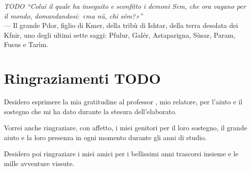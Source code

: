 \cleardoublepage
{}
{}

\begin{flushright}{
    \slshape TODO
    ``Colui il quale ha inseguito e sconfitto i demoni Sem, che ora vagano per il mondo, domandandosi: «ma nü, chi sëm?»''} \\
    \medskip
    --- Il grande Pdor, figlio di Kmer, della tribù di Ishtar, della terra desolata dei Kfnir, uno degli ultimi sette saggi: Pfulur, Galér, Astaparigna, Sùsar, Param, Fusus e Tarìm.
\end{flushright}

\begingroup
\let\clearpage\relax
\let\cleardoublepage\relax
\let\cleardoublepage\relax

\chapter*{Ringraziamenti TODO}

\noindent Desidero esprimere la mia gratitudine al professor \myProf, mio relatore, per l'aiuto e il sostegno che mi ha dato durante la stesura dell'elaborato.

\vspace{0.35cm}

\noindent Vorrei anche ringraziare, con affetto, i miei genitori per il loro sostegno, il grande aiuto e la loro presenza in ogni momento durante gli anni di studio.

\vspace{0.35cm}

\noindent Desidero poi ringraziare i miei amici per i bellissimi anni trascorsi insieme e le mille avventure vissute.

\vspace{0.75cm}

\noindent{\myLocation, \myTime}
\hfill \textit{\myName}

\endgroup

